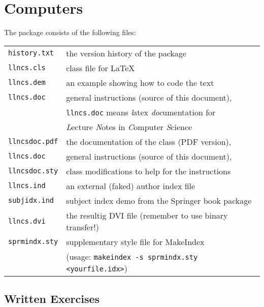 \section{Computers}
%
The package consists of the following files:
\begin{flushleft}
\begin{tabular}{@{}p{2.5cm}l}
{\tt history.txt}& the version history of the package\\[2pt]
{\tt llncs.cls}  & class file for \LaTeX{}\\[2pt]
{\tt llncs.dem}  & an example showing how to code the text\\[2pt]
{\tt llncs.doc}  & general instructions (source of this document),\\
        & {\tt llncs.doc} means {\itshape l\/}atex {\itshape doc\/}umentation for\\
        & {\itshape L\/}ecture {\itshape N}otes in {\itshape C\/}omputer {\itshape S\/}cience\\
{\tt llncsdoc.pdf}& the documentation of the class (PDF version),\\
{\tt llncs.doc}  & general instructions (source of this document),\\
{\tt llncsdoc.sty}  & class modifications to help for the instructions\\
{\tt llncs.ind} & an external (faked) author index file\\
{\tt subjidx.ind} & subject index demo from the Springer book package\\
{\tt llncs.dvi}    & the resultig DVI file (remember to use binary transfer!)\\[2pt]
{\tt sprmindx.sty} & supplementary style file for MakeIndex\\
                   & (usage: {\tt makeindex -s sprmindx.sty <yourfile.idx>})
\end{tabular}
\end{flushleft}


\subsection{Written Exercises}

